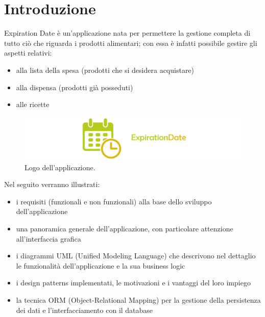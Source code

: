 \chapter{Introduzione}

Expiration Date è un'applicazione nata per permettere la gestione completa di tutto ciò che riguarda i prodotti alimentari; con essa è infatti possibile gestire gli aspetti relativi:
\begin{itemize}
  \item alla lista della spesa (prodotti che si desidera acquistare)
  \item alla dispensa (prodotti già posseduti)
  \item alle ricette
\end{itemize}

\begin{figure}[H]
  \includegraphics[width=\linewidth]{images/app-logo.png}
  \caption{Logo dell'applicazione.}
  \label{fig:applogo}
\end{figure}

Nel seguito verranno illustrati:
\begin{itemize}
\item i requisiti (funzionali e non funzionali) alla base dello sviluppo dell'applicazione
\item una panoramica generale dell'applicazione, con particolare attenzione all'interfaccia grafica
\item i diagrammi UML (Unified Modeling Language) che descrivono nel dettaglio le funzionalità dell'applicazione e la sua business logic
\item i design patterns implementati, le motivazioni e i vantaggi del loro impiego
\item la tecnica ORM (Object-Relational Mapping) per la gestione della persistenza dei dati e l'interfacciamento con il database
\end{itemize}

